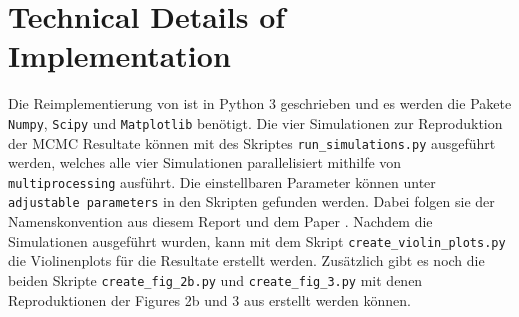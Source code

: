 \documentclass{scrartcl}
\begin{document}
    \section{Technical Details of Implementation}
    Die Reimplementierung von \cite{lau2019} ist in Python 3 geschrieben und es werden die Pakete \texttt{Numpy}, \texttt{Scipy}
    und \texttt{Matplotlib} benötigt. Die vier Simulationen zur Reproduktion der MCMC Resultate können mit des Skriptes
    \texttt{run\_simulations.py} ausgeführt werden, welches alle vier Simulationen parallelisiert mithilfe von \texttt{multiprocessing} ausführt.
    Die einstellbaren Parameter können unter \texttt{adjustable parameters} in den Skripten gefunden werden. Dabei folgen sie der Namenskonvention aus diesem Report
    und dem Paper \cite{lau2019}. Nachdem die Simulationen ausgeführt wurden, kann mit dem Skript \texttt{create\_violin\_plots.py}
    die Violinenplots für die Resultate erstellt werden. Zusätzlich gibt es noch die beiden Skripte \texttt{create\_fig\_2b.py}
    und \texttt{create\_fig\_3.py} mit denen Reproduktionen der Figures 2b und 3 aus \cite{lau2019} erstellt werden können.

    
    
\end{document}
